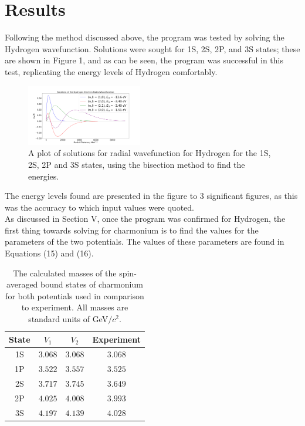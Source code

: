 \documentclass[10pt, twocolumn]{article}
\begin{document}
\section{Results}
Following the method discussed above, the program was tested by solving the Hydrogen wavefunction. 
Solutions were sought for 1S, 2S, 2P, and 3S states; these are shown in Figure 1, and as can be seen, the program was successful in this test, replicating the energy levels of Hydrogen comfortably. 
\begin{figure}[H]
    \centering
    \includegraphics[width=0.45\textwidth]{Hydro}
    \caption{A plot of solutions for radial wavefunction for Hydrogen for the 1S, 2S, 2P and 3S states, using the bisection method to find the energies.}
\end{figure}
The energy levels found are presented in the figure to 3 significant figures, as this was the accuracy to which input values were quoted. \\
As discussed in Section \RN{5}, once the program was confirmed for Hydrogen, the first thing towards solving for charmonium is to find the values for the parameters of the two potentials. 
The values of these parameters are found in Equations (15) and (16).
\begin{table}[H]
    \vspace{7pt}
    \centering
    \begin{tabular}{|c|c|c|c|}
        \hline 
        \rowcolor{lightgray} State & $V_1$ & $V_2$ & Experiment \\
        \hline
        1S & $3.068$ & $3.068$ & $3.068$ \\
        \hline
        1P & $3.522$ & $3.557$ & $3.525$ \\
        \hline
        2S & $3.717$ & $3.745$ & $3.649$ \\
        \hline
        2P & $4.025$ & $4.008$ & $3.993$ \\
        \hline
        3S & $4.197$ & $4.139$ & $4.028$ \\
        \hline
    \end{tabular}
    \caption{The calculated masses of the spin-averaged bound states of charmonium for both potentials used in comparison to experiment\cite{6,7,10}. All masses are standard units of GeV$/c^2$.}
\end{table}
\end{document}
